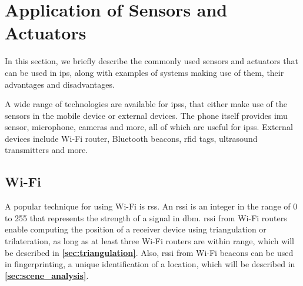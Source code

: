 \section{Application of Sensors and Actuators}\label{sec:actuator_sensor} 

In this section, we briefly describe the commonly used sensors and actuators that can be used in \gls{ips}, along with examples of systems making use of them, their advantages and disadvantages. 

A wide range of technologies are available for \gls{ips}s, that either make use of the sensors in the mobile device or external devices. The phone itself provides \gls{imu} sensor, microphone, cameras and more, all of which are useful for \gls{ips}s. External devices include Wi-Fi router, Bluetooth beacons, \gls{rfid} tags, ultrasound transmitters and more.





\subsection{Wi-Fi} \label{sec:WiFi}
A popular technique for using Wi-Fi is \gls{rss}. An \gls{rssi} is an integer in the range of 0 to 255 that represents the strength of a signal in \gls{dbm}.\cite{RSSIWiFiDistance, RSSIMeasurement}
\gls{rssi} from Wi-Fi routers enable computing the position of a receiver device using triangulation or trilateration, as long as at least three Wi-Fi routers are within range, which will be described in \textbf{\autoref{sec:triangulation}}.
Also, \gls{rssi} from Wi-Fi beacons can be used in fingerprinting, a unique identification of a location, which will be described in \textbf{\autoref{sec:scene_analysis}}\cite{HabilitationThesis}.

